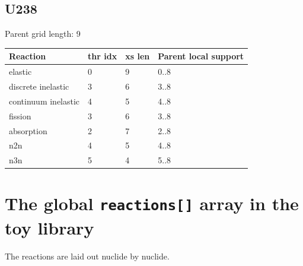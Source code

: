 \documentclass[11pt,a4paper]{article}
\begin{document}
\subsection{U238}
Parent grid length: 9
\begin{longtable}{p{3.3cm} p{2cm} p{2cm} p{4.3cm}}
\toprule
Reaction & thr idx & xs len & Parent local support \\
\midrule
elastic & 0 & 9 & 0..8 \\
discrete inelastic & 3 & 6 & 3..8 \\
continuum inelastic & 4 & 5 & 4..8 \\
fission & 3 & 6 & 3..8 \\
absorption & 2 & 7 & 2..8 \\
n2n & 4 & 5 & 4..8 \\
n3n & 5 & 4 & 5..8 \\
\bottomrule
\end{longtable}

\section{The global \texttt{reactions[]} array in the toy library}
The reactions are laid out nuclide by nuclide.
\end{document}

